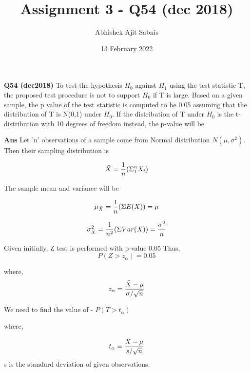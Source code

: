 \documentclass{article}
\title{\textbf{Assignment 3 - Q54 (dec 2018)}}
\author{Abhishek Ajit Sabnis}
\date{13 February 2022}
\begin{document}
\maketitle

\textbf{Q54 (dec2018)} To test the hypothesis $H_0$ against $H_1$ using the test statistic T, the proposed test procedure is not to support $H_0$ if T is large. Based on a given sample, the p value of the test statistic is computed to be 0.05 assuming that the distribution of T is N(0,1) under $H_0$. If the distribution of T under $H_0$ is the t-distribution with 10 degrees of freedom instead, the p-value will be 

\vspace{0.5cm}

\textbf{Ans} Let 'n' observations of a sample come from Normal distribution $N(\mu, \sigma^2)$. Then their sampling distribution is 

\begin{equation}
    \Bar{X} = \frac{1}{n} (\Sigma_{1}^{n} X_i)
\end{equation}

The sample mean and variance will be 

\begin{equation}
    \mu_{\Bar{X}} = \frac{1}{n} (\Sigma E(X)) = \mu
\end{equation}

\begin{equation}
    \sigma_{\Bar{X}}^2 = \frac{1}{n^2} (\Sigma Var(X)) = \frac{\sigma^2}{n}
\end{equation}

\vspace{0.3cm}


Given initially, Z test is performed with p-value 0.05 Thus,
\begin{equation}
    P(Z>z_{\alpha}) = 0.05
\end{equation}

where, 
\begin{equation}
    z_{\alpha} = \frac{\Bar{X} - \mu}{\sigma/\sqrt{n}}
\end{equation}

We need to find the value of - $P(T> t_{\alpha})$

where,

\begin{equation}
    t_{\alpha} = \frac{\Bar{X} - \mu}{s/\sqrt{n}}
\end{equation}
s is the standard deviation of given observations. 
\end{document}
